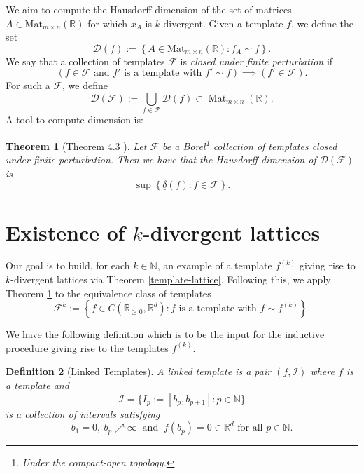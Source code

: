 \documentclass[reqno,11pt]{amsart}
\theoremstyle{plain}
\newtheorem{thm}{Theorem}[section]
\newtheorem{defn}[thm]{Definition}
\theoremstyle{definition}
\theoremstyle{remark}
\numberwithin{equation}{section}
\newcommand{\R}{{\mathbb{R}}}
\newcommand{\N}{{\mathbb{N}}}
\begin{document}
We aim to compute the Hausdorff dimension of the set of matrices $A \in \text{Mat}_{m \times n}(\R)$ for which $x_A$ is $k$-divergent. 
Given a template $f$, we define the set
\begin{equation}
    \mathcal{D}(f) := \left\lbrace A \in \text{Mat}_{m\times n}(\R) : f_A \sim f \right\rbrace.
\end{equation}
We say that a collection of templates $\mathcal{F}$ is \textit{closed under finite perturbation} if 
\begin{equation}
    \left(f \in \mathcal{F} \text{ and } f' \text{ is a template with } f'\sim f \right) \implies \left(f' \in \mathcal{F}\right).
\end{equation}
For such a $\mathcal{F}$, we define
\begin{equation}
    \mathcal{D}(\mathcal{F}) := \bigcup_{f \in \mathcal{F}} \mathcal{D}(f) \subset \operatorname{Mat}_{m \times n}(\R).
\end{equation}
A tool to compute dimension is:
\begin{thm}[Theorem 4.3 \cite{DFSU}]\label{DFSU-dimension-thm}
Let $\mathcal{F}$ be a Borel\footnote{Under the compact-open topology.} collection of templates closed under finite perturbation.
Then we have that the Hausdorff dimension of $\mathcal{D}(\mathcal{F})$ is
\begin{equation}
    \sup\left\lbrace \underline{\delta}(f): f \in \mathcal{F}\right\rbrace.
\end{equation}
\end{thm}

\section{Existence of $k$-divergent lattices}

Our goal is to build, for each $k \in \N$, an example of a template $f^{(k)}$ giving rise to $k$-divergent lattices via Theorem \ref{template-lattice}. 
Following this, we apply Theorem \ref{DFSU-dimension-thm} to the equivalence class of templates
\begin{equation}
    \mathcal{F}^k := \left\lbrace f \in C(\R_{\geq 0}, \R^d) : f \text{ is a template with } f\sim f^{(k)} \right\rbrace.
\end{equation}

We have the following definition which is to be the input for the inductive procedure giving rise to the templates $f^{(k)}$.
\begin{defn}[Linked Templates]
    A linked template is a pair $(f, \mathcal{I})$ where $f$ is a template and $$\mathcal{I} = \{I_p:=[b_p,b_{p+1}]: p \in \N\}$$
     is a collection of intervals satisfying
     \begin{equation*}
         b_1 =0,\  b_p \nearrow \infty\ \text{ and }\ f(b_p) = 0\in \R^d \text{ for all } p \in \N.
     \end{equation*}
\end{defn}
\end{document}
